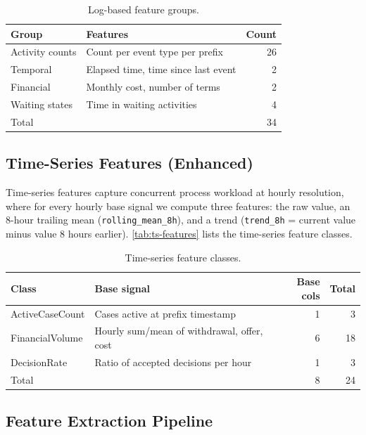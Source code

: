 \documentclass[runningheads]{llncs}
\begin{document}
\begin{table}[H]
    \centering
    \caption{Log-based feature groups.}
    \label{tab:log-features}
    \begin{tabularx}{\textwidth}{lXr}
        \toprule
        Group & Features & Count \\
        \midrule
        Activity counts & Count per event type per prefix & 26 \\
        Temporal & Elapsed time, time since last event & 2 \\
        Financial & Monthly cost, number of terms & 2 \\
        Waiting states & Time in waiting activities & 4 \\
        \midrule
        Total & & 34 \\
        \bottomrule
    \end{tabularx}
\end{table}

\subsection{Time-Series Features (Enhanced)}
\label{sec:ts-features}

Time-series features capture concurrent process workload at hourly
resolution, where for every hourly base signal we compute three features: the
raw value, an 8-hour trailing mean (\texttt{rolling\_mean\_8h}), and a
trend (\texttt{trend\_8h} = current value minus value 8 hours earlier).
\autoref{tab:ts-features} lists the time-series feature classes.

\begin{table}[H]
    \centering
    \caption{Time-series feature classes.}
    \label{tab:ts-features}
    \begin{tabularx}{\textwidth}{lXrr}
        \toprule
        Class & Base signal & Base cols & Total \\
        \midrule
        ActiveCaseCount & Cases active at prefix timestamp & 1 & 3 \\
        FinancialVolume & Hourly sum/mean of withdrawal, offer, cost & 6 & 18 \\
        DecisionRate & Ratio of accepted decisions per hour & 1 & 3 \\
        \midrule
        Total & & 8 & 24 \\
        \bottomrule
    \end{tabularx}
\end{table}

\subsection{Feature Extraction Pipeline}
\label{sec:extraction}
\end{document}
